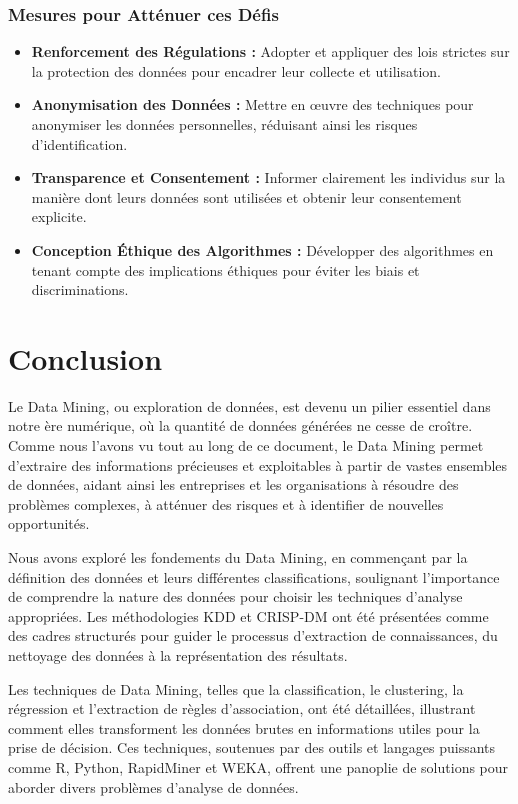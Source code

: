 \documentclass[a4paper,14pt]{article}
\begin{document}
		\subsubsection{Mesures pour Atténuer ces Défis}
			\begin{itemize}
				\item \textbf{Renforcement des Régulations :} Adopter et appliquer des lois strictes sur la protection des données pour encadrer leur collecte et utilisation.
				\item \textbf{Anonymisation des Données :} Mettre en œuvre des techniques pour anonymiser les données personnelles, réduisant ainsi les risques d'identification.
				\item \textbf{Transparence et Consentement :} Informer clairement les individus sur la manière dont leurs données sont utilisées et obtenir leur consentement explicite.
				\item \textbf{Conception Éthique des Algorithmes :} Développer des algorithmes en tenant compte des implications éthiques pour éviter les biais et discriminations.
			\end{itemize}

    \newpage
     \section*{Conclusion}
Le Data Mining, ou exploration de données, est devenu un pilier essentiel dans notre ère numérique, où la quantité de données générées ne cesse de croître. Comme nous l'avons vu tout au long de ce document, le Data Mining permet d'extraire des informations précieuses et exploitables à partir de vastes ensembles de données, aidant ainsi les entreprises et les organisations à résoudre des problèmes complexes, à atténuer des risques et à identifier de nouvelles opportunités.

Nous avons exploré les fondements du Data Mining, en commençant par la définition des données et leurs différentes classifications, soulignant l'importance de comprendre la nature des données pour choisir les techniques d'analyse appropriées. Les méthodologies KDD et CRISP-DM ont été présentées comme des cadres structurés pour guider le processus d'extraction de connaissances, du nettoyage des données à la représentation des résultats.

Les techniques de Data Mining, telles que la classification, le clustering, la régression et l'extraction de règles d'association, ont été détaillées, illustrant comment elles transforment les données brutes en informations utiles pour la prise de décision. Ces techniques, soutenues par des outils et langages puissants comme R, Python, RapidMiner et WEKA, offrent une panoplie de solutions pour aborder divers problèmes d'analyse de données.
\end{document}
